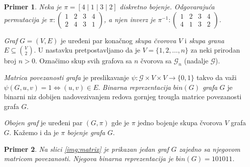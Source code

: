 \documentclass[12pt,oneside]{memoir}
\newtheorem{example}{Primer}
\theoremstyle{definition}
\begin{document}
   \begin{example}
	   Neka je $\pi = [4 \mid 1 \mid 3 \mid 2]$ diskretno bojenje. Odgovarajuća
	   permutacija je $\pi :
	   \begin{pmatrix}
		   1 & 2 & 3 & 4 \\
		   2 & 4 & 3 & 1
	   \end{pmatrix}$,
	   a njen inverz je $\pi^{-1} :
	   \begin{pmatrix}
		   1 & 2 & 3 & 4 \\
		   4 & 1 & 3 & 2
	   \end{pmatrix}$.
   \end{example}

   \emph{Graf} $G = (V, E)$ je uređeni par konačnog \emph{skupa čvorova} $V$ i
   \emph{skupa grana} $E \subseteq {V \choose 2}$. U nastavku pretpostavljamo da
   je $V = \{1, 2, \dots, n\}$ za neki prirodan broj $n > 0$. Označimo skup svih
   grafova sa $n$ čvorova sa $\mathcal{G}_n$ (nadalje $\mathcal{G}$).

   \emph{Matrica povezanosti grafa} je preslikavanje $\psi : \mathcal{G} \times
   V \times V \to \{0, 1\}$ takvo da važi $\psi(G, u, v) = 1 \iff (u, v) \in
   E$.  \emph{Binarna reprezentacija $bin(G)$ grafa} $G$ je binarni niz dobijen
   nadovezivanjem redova gornjeg trougla matrice povezanosti grafa $G$.

   \emph{Obojen graf} je uređeni par $(G, \pi)$ gde je $\pi$ jedno bojenje
   skupa čvorova $V$ grafa $G$. Kažemo i da je $\pi$ \emph{bojenje grafa} $G$.

   \begin{example}
	   Na slici \ref{img:matrix} je prikazan jedan graf $G$ zajedno sa njegovom
	   matricom povezanosti. Njegova binarna reprezentacija je $bin(G) =
	   101011$.
   \end{example}
\end{document}
